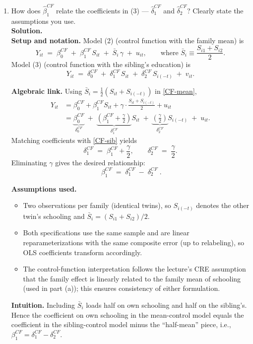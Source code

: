 \documentclass[12pt]{article}
\begin{document}
\begin{enumerate}[label=\textbf{(\alph*)}, leftmargin=1.5em]
  \item How does $\hat{\beta}_1^{CF}$ relate the coefficients in (3) — $\hat{\delta}_1^{CF}$ and $\hat{\delta}_2^{CF}$? Clearly state the assumptions you use.\\[0.5em]
  
  \textbf{Solution.} \\

  \textbf{Setup and notation.} Model (2) (control function with the family mean) is
  \[
  Y_{it} \;=\; \beta^{CF}_0 \;+\; \beta^{CF}_1\, S_{it} \;+\; \bar S_i\,\gamma \;+\; u_{it},
  \qquad \text{where } \bar S_i \equiv \frac{S_{i1}+S_{i2}}{2}.
  \tag{CF-mean}
  \]
  Model (3) (control function with the sibling’s education) is
  \[
  Y_{it} \;=\; \delta^{CF}_0 \;+\; \delta^{CF}_1\, S_{it} \;+\; \delta^{CF}_2\, S_{i(-t)} \;+\; v_{it}.
  \tag{CF-sib}
  \]

  \textbf{Algebraic link.} Using $\bar S_i = \tfrac{1}{2}(S_{it} + S_{i(-t)})$ in \eqref{CF-mean},
  \[
  \begin{aligned}
  Y_{it}
  &= \beta^{CF}_0 + \beta^{CF}_1 S_{it} + \gamma \cdot \frac{S_{it}+S_{i(-t)}}{2} + u_{it} \\
  &= \underbrace{\beta^{CF}_0}_{\delta^{CF}_0}
  \;+\; \underbrace{\left(\beta^{CF}_1 + \frac{\gamma}{2}\right)}_{\delta^{CF}_1} S_{it}
  \;+\; \underbrace{\left(\frac{\gamma}{2}\right)}_{\delta^{CF}_2} S_{i(-t)}
  \;+\; u_{it}.
  \end{aligned}
  \]
  Matching coefficients with \eqref{CF-sib} yields
  \[
  \delta^{CF}_1 \;=\; \beta^{CF}_1 + \frac{\gamma}{2},
  \qquad
  \delta^{CF}_2 \;=\; \frac{\gamma}{2}.
  \]
  Eliminating $\gamma$ gives the desired relationship:
  \[
  \boxed{ \;\beta^{CF}_1 \;=\; \delta^{CF}_1 \;-\; \delta^{CF}_2\; }.
  \]

  \textbf{Assumptions used.}
  \begin{itemize}\itemsep0.2em
    \item Two observations per family (identical twins), so $S_{i(-t)}$ denotes the other twin’s schooling and $\bar S_i = (S_{i1}+S_{i2})/2$.
    \item Both specifications use the same sample and are linear reparameterizations with the same composite error (up to relabeling), so OLS coefficients transform accordingly.
    \item The control-function interpretation follows the lecture’s CRE assumption that the family effect is linearly related to the family mean of schooling (used in part (a)); this ensures consistency of either formulation.
  \end{itemize}

  \textbf{Intuition.} Including $\bar S_i$ loads half on own schooling and half on the sibling’s. Hence the coefficient on own schooling in the mean-control model equals the coefficient in the sibling-control model minus the “half-mean” piece, i.e., $\beta^{CF}_1=\delta^{CF}_1-\delta^{CF}_2$.
\end{enumerate}
\end{document}
